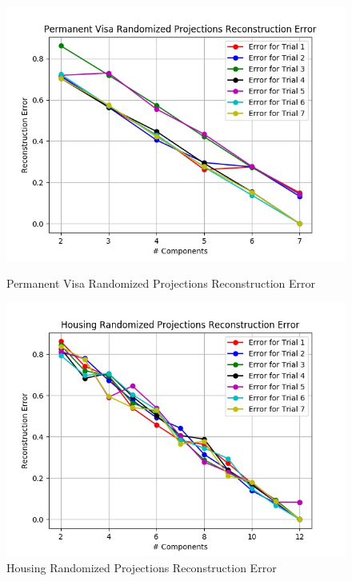 \documentclass[h]{article}
\begin{document}
 \begin{figure}[H]
      \includegraphics[width=1\textwidth,keepaspectratio]{permanent_visa_randomized_projections_reconstruction_error.jpg} 
      \caption*{Permanent Visa Randomized Projections Reconstruction Error } 
   \endminipage\hfill
      \includegraphics[width=1\textwidth,keepaspectratio]{housing_randomized_projections_reconstruction_error.jpg} 
      \caption*{Housing Randomized Projections Reconstruction Error} 
   \endminipage\hfill
\end{figure}
\end{document}
